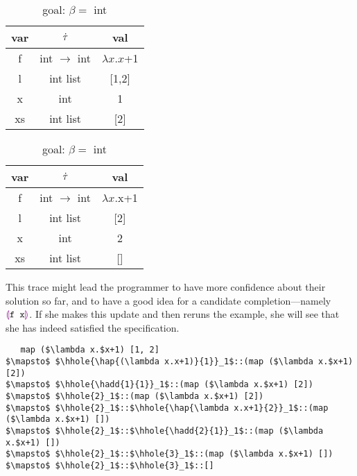 \begin{table}
  \caption{hole context tableaux}
  \label{tabx}
  \begin{subtable}{.5\linewidth}
    \caption{goal: $\beta=$ int}
    \centering
        {
          \footnotesize
          \begin{tabular}{c|c|c}
            var & $\dot{\tau}$ & val\\
            \hline
            f & int $\to$ int & $\lambda x.x$+1\\
            l & int list & [1,2]\\
            x & int & 1\\
            xs & int list & [2]\\
          \end{tabular}
        }
  \end{subtable}%
  \begin{subtable}{.5\linewidth}
    \caption{goal: $\beta=$ int}
    \centering
        {
          \footnotesize
          \begin{tabular}{c|c|c}
            var & $\dot{\tau}$ & val\\
            \hline
            f & int $\to$ int & $\lambda x.$x+1\\
            l & int list & [2]\\
            x & int & 2\\
            xs & int list & []\\
          \end{tabular}
        }
  \end{subtable}
\end{table}

This trace might lead the programmer to have more confidence about their
solution so far, and to have a good idea for a candidate
completion---namely $\textcolor{violet}{\llparenthesis}\texttt{f x}\textcolor{violet}{\rrparenthesis}$. If she makes this update and
then reruns the example, she will see that she has indeed satisfied the
specification.
\hspace{1cm}
\begin{lstlisting}
   map ($\lambda x.$x+1) [1, 2]
$\mapsto$ $\hhole{\hap{(\lambda x.x+1)}{1}}_1$::(map ($\lambda x.$x+1) [2])
$\mapsto$ $\hhole{\hadd{1}{1}}_1$::(map ($\lambda x.$x+1) [2])
$\mapsto$ $\hhole{2}_1$::(map ($\lambda x.$x+1) [2])
$\mapsto$ $\hhole{2}_1$::$\hhole{\hap{\lambda x.x+1}{2}}_1$::(map ($\lambda x.$x+1) [])
$\mapsto$ $\hhole{2}_1$::$\hhole{\hadd{2}{1}}_1$::(map ($\lambda x.$x+1) [])
$\mapsto$ $\hhole{2}_1$::$\hhole{3}_1$::(map ($\lambda x.$x+1) [])
$\mapsto$ $\hhole{2}_1$::$\hhole{3}_1$::[]
\end{lstlisting}
